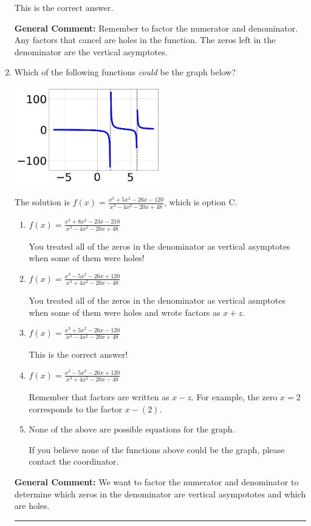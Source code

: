 \documentclass{extbook}[14pt]
\newcommand{\litem}[1]{\item #1

\rule{\textwidth}{0.4pt}}
\begin{document}
\begin{enumerate}
{\begin{enumerate}[label=\Alph*.]
This is the correct answer.
\end{enumerate}

\textbf{General Comment:} Remember to factor the numerator and denominator. Any factors that cancel are holes in the function. The zeros left in the denominator are the vertical asymptotes.
}
\litem{
Which of the following functions \textit{could} be the graph below?

\begin{center}
    \includegraphics[width=0.5\textwidth]{../Figures/identifyGraphOfRationalFunctionCopyB.png}
\end{center}




The solution is \( f(x)=\frac{x^{3} +5 x^{2} -26 x -120}{x^{3} -4 x^{2} -20 x + 48} \), which is option C.\begin{enumerate}[label=\Alph*.]
\item \( f(x)=\frac{x^{3} +8 x^{2} -23 x -210}{x^{3} -4 x^{2} -20 x + 48} \)

You treated all of the zeros in the denominator as vertical asymptotes when some of them were holes!
\item \( f(x)=\frac{x^{3} -5 x^{2} -26 x + 120}{x^{3} +4 x^{2} -20 x -48} \)

You treated all of the zeros in the denominator as vertical asmptotes when some of them were holes and wrote factors as $x+z$.
\item \( f(x)=\frac{x^{3} +5 x^{2} -26 x -120}{x^{3} -4 x^{2} -20 x + 48} \)

This is the correct answer!
\item \( f(x)=\frac{x^{3} -5 x^{2} -26 x + 120}{x^{3} +4 x^{2} -20 x -48} \)

Remember that factors are written as $x-z$. For example, the zero $x=2$ corresponds to the factor $x-(2)$.
\item \( \text{None of the above are possible equations for the graph.} \)

If you believe none of the functions above could be the graph, please contact the coordinator.
\end{enumerate}

\textbf{General Comment:} We want to factor the numerator and denominator to determine which zeros in the denominator are vertical asympototes and which are holes.
}
\end{enumerate}
\end{document}

